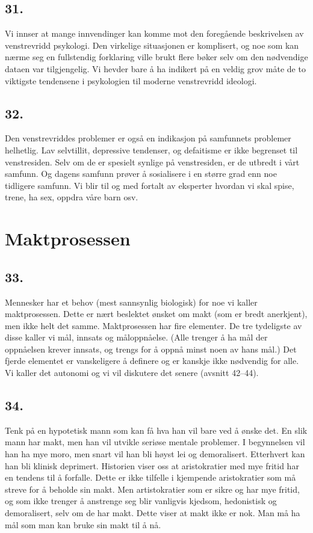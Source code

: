 \documentclass[oneside]{book}
\begin{document}
\section*{31.}
Vi innser at mange innvendinger kan komme mot den foregående beskrivelsen av
venstrevridd psykologi. Den virkelige situasjonen er komplisert, og noe som kan
nærme seg en fullstendig forklaring ville brukt flere bøker selv om den
nødvendige dataen var tilgjengelig. Vi hevder bare å ha indikert på en veldig
grov måte de to viktigste tendensene i psykologien til moderne venstrevridd
ideologi.

\section*{32.}
Den venstrevriddes problemer er også en indikasjon på samfunnets problemer
helhetlig. Lav selvtillit, depressive tendenser, og defaitisme er ikke
begrenset til venstresiden. Selv om de er spesielt synlige på venstresiden, er
de utbredt i vårt samfunn. Og dagens samfunn prøver å sosialisere i en større
grad enn noe tidligere samfunn. Vi blir til og med fortalt av eksperter hvordan
vi skal spise, trene, ha sex, oppdra våre barn osv.

\chapter{Maktprosessen}
\section*{33.}
Mennesker har et behov (mest sannsynlig biologisk) for noe vi kaller
maktprosessen. Dette er nært beslektet ønsket om makt (som er bredt
anerkjent), men ikke helt det samme. Maktprosessen har fire elementer. De tre
tydeligste av disse kaller vi mål, innsats og måloppnåelse. (Alle trenger å ha
mål der oppnåelsen krever innsats, og trengs for å oppnå minst noen av hans
mål.) Det fjerde elementet er vanskeligere å definere og er kanskje ikke
nødvendig for alle. Vi kaller det autonomi og vi vil diskutere det senere
(avsnitt 42--44).

\section*{34.}
Tenk på en hypotetisk mann som kan få hva han vil bare ved å ønske det. En slik
mann har makt, men han vil utvikle seriøse mentale problemer. I begynnelsen vil
han ha mye moro, men snart vil han bli høyst lei og demoralisert. Etterhvert
kan han bli klinisk deprimert. Historien viser oss at aristokratier med mye
fritid har en tendens til å forfalle. Dette er ikke tilfelle i kjempende
aristokratier som må streve for å beholde sin makt. Men artistokratier som er
sikre og har mye fritid, og som ikke trenger å anstrenge seg blir vanligvis
kjedsom, hedonistisk og demoralisert, selv om de har makt. Dette viser at makt
ikke er nok. Man må ha mål som man kan bruke sin makt til å nå.
\end{document}
